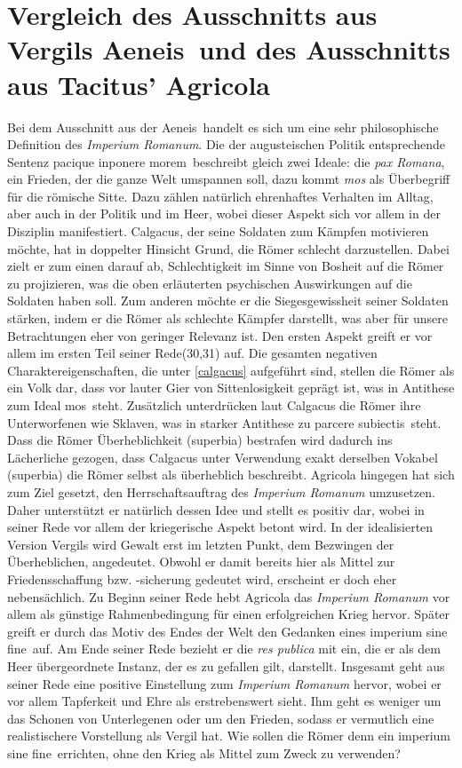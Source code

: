 \documentclass[12pt]{article}
\begin{document}
	\section{Vergleich des Ausschnitts aus Vergils \glqq Aeneis\grqq\ und des Ausschnitts aus Tacitus' \glqq Agricola\grqq}
	\label{vergil-tacitus}
	Bei dem Ausschnitt aus der \glqq Aeneis\grqq\ handelt es sich um eine sehr philosophische Definition des \textit{Imperium Romanum}. Die der augusteischen Politik entsprechende Sentenz \glqq pacique inponere morem\grqq\ beschreibt gleich zwei Ideale: die \textit{pax Romana}, ein Frieden, der die ganze Welt umspannen soll, dazu kommt \textit{mos} als Überbegriff für die römische Sitte. Dazu zählen natürlich ehrenhaftes Verhalten im Alltag, aber auch in der Politik und im Heer, wobei dieser Aspekt sich vor allem in der Disziplin manifestiert. 
	Calgacus, der seine Soldaten zum Kämpfen motivieren möchte, hat in doppelter Hinsicht Grund, die Römer schlecht darzustellen. Dabei zielt er zum einen darauf ab, Schlechtigkeit im Sinne von Bosheit auf die Römer zu projizieren, was die oben erläuterten psychischen Auswirkungen auf die Soldaten haben soll. Zum anderen möchte er die Siegesgewissheit seiner Soldaten stärken, indem er die Römer als schlechte Kämpfer darstellt, was aber für unsere Betrachtungen eher von geringer Relevanz ist.
	Den ersten Aspekt greift er vor allem im ersten Teil seiner Rede(30,31) auf. Die gesamten negativen Charaktereigenschaften, die unter \ref{calgacus} aufgeführt sind, stellen die Römer als ein Volk dar, dass vor lauter Gier von Sittenlosigkeit geprägt ist, was in Antithese zum Ideal \glqq mos\grqq\ steht. Zusätzlich unterdrücken laut Calgacus die Römer ihre Unterworfenen wie Sklaven, was in starker Antithese zu \glqq parcere subiectis\grqq\ steht. Dass die Römer Überheblichkeit (\glqq superbia\grqq) bestrafen wird dadurch ins Lächerliche gezogen, dass Calgacus unter Verwendung exakt derselben Vokabel (\glqq superbia\grqq) die Römer selbst als überheblich beschreibt. 
	Agricola hingegen hat sich zum Ziel gesetzt, den Herrschaftsauftrag des \textit{Imperium Romanum} umzusetzen. Daher unterstützt er natürlich dessen Idee und stellt es positiv dar, wobei in seiner Rede vor allem der kriegerische Aspekt betont wird. In der idealisierten Version Vergils wird Gewalt erst im letzten Punkt, dem Bezwingen der Überheblichen, angedeutet. Obwohl er damit bereits hier als Mittel zur Friedensschaffung bzw. -sicherung gedeutet wird, erscheint er doch eher nebensächlich. Zu Beginn seiner Rede hebt Agricola das \textit{Imperium Romanum} vor allem als günstige Rahmenbedingung für einen erfolgreichen Krieg hervor. Später greift er durch das Motiv des Endes der Welt den Gedanken eines \glqq imperium sine fine\grqq\ auf. Am Ende seiner Rede bezieht er die \textit{res publica} mit ein, die er als dem Heer übergeordnete Instanz, der es zu gefallen gilt, darstellt. Insgesamt geht aus seiner Rede eine positive Einstellung zum \textit{Imperium Romanum} hervor, wobei er vor allem Tapferkeit und Ehre als erstrebenswert sieht. Ihm geht es weniger um das Schonen von Unterlegenen oder um den Frieden, sodass er vermutlich eine realistischere Vorstellung als Vergil hat. Wie sollen die Römer denn ein \glqq imperium sine fine\grqq\ errichten, ohne den Krieg als Mittel zum Zweck zu verwenden?
\end{document}
